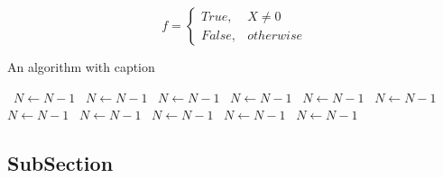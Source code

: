 \documentclass[a4paper]{article}
\begin{document}
\begin{equation}   f =
\begin{cases} True, & X \neq 0\\
False, & otherwise
\end{cases}
\end{equation}

\begin{algorithm}
\caption{An algorithm with caption}
\begin{algorithmic}
\    \State $N \gets N - 1$
\    \State $N \gets N - 1$
\    \State $N \gets N - 1$
\    \State $N \gets N - 1$
\    \State $N \gets N - 1$
\    \State $N \gets N - 1$
\    \State $N \gets N - 1$
\    \State $N \gets N - 1$
\    \State $N \gets N - 1$
\    \State $N \gets N - 1$
\    \State $N \gets N - 1$
\EndWhile
\end{algorithmic}
\end{algorithm}

\subsection{SubSection}
\end{document}

